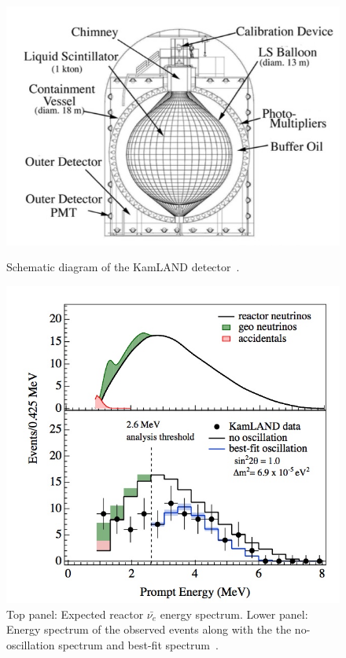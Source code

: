 \begin{figure}[h!]
  \centering
  \begin{minipage}[b]{0.49\textwidth}
    \includegraphics[width=\textwidth]{figures/KamLAND.jpeg}
    \vspace{2mm}
    \caption{Schematic diagram of the KamLAND detector~\cite{46KamLAND}.}
    \label{fig:KamLAND}
  \end{minipage}
  \hfill
  \begin{minipage}[b]{0.49\textwidth}
    \includegraphics[width=\textwidth]{figures/KamLAND2.jpeg}
       \vspace{2mm}
    \caption{Top panel: Expected reactor $\bar{\nu_e}$ energy spectrum. Lower panel: Energy spectrum of the observed events along with the the no-oscillation spectrum and best-fit spectrum~\cite{46KamLAND}. }
     \label{fig:KamLAND2}
  \end{minipage}
\end{figure}

